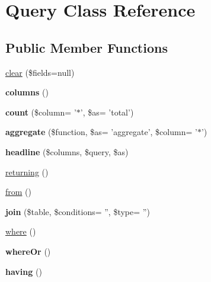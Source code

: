 \hypertarget{classQuery}{
\section{Query Class Reference}
\label{classQuery}
}
\subsection*{Public Member Functions}
\begin{DoxyCompactItemize}
\item 
\hyperlink{classQuery_af219d3aed5b3940b49d414d69bab501d}{clear} (\$fields=null)
\item 
\hypertarget{classQuery_ac5a3db6877b1d63b67def06e24bb86cb}{
{\bfseries columns} ()}
\label{classQuery_ac5a3db6877b1d63b67def06e24bb86cb}

\item 
\hypertarget{classQuery_a5e5d7b30a86a5b809137a57a62b684fa}{
{\bfseries count} (\$column= '$\ast$', \$as= 'total')}
\label{classQuery_a5e5d7b30a86a5b809137a57a62b684fa}

\item 
\hypertarget{classQuery_a9ec81787bd0d69ec85987a047915bcb9}{
{\bfseries aggregate} (\$function, \$as= 'aggregate', \$column= '$\ast$')}
\label{classQuery_a9ec81787bd0d69ec85987a047915bcb9}

\item 
\hypertarget{classQuery_ae158383677b601890431921bb035f51b}{
{\bfseries headline} (\$columns, \$query, \$as)}
\label{classQuery_ae158383677b601890431921bb035f51b}

\item 
\hyperlink{classQuery_af44f7bf797779dbbb930e60a53011c6b}{returning} ()
\item 
\hyperlink{classQuery_aaa091145c66718e59db922d065160863}{from} ()
\item 
\hypertarget{classQuery_ade76ff8694567ab372a4f450bb1bcd2e}{
{\bfseries join} (\$table, \$conditions= '', \$type= '')}
\label{classQuery_ade76ff8694567ab372a4f450bb1bcd2e}

\item 
\hyperlink{classQuery_ab1781adb9932c6280373e2abd698f9c8}{where} ()
\item 
\hypertarget{classQuery_a296b505b36d9bc21dfa1608471eabede}{
{\bfseries whereOr} ()}
\label{classQuery_a296b505b36d9bc21dfa1608471eabede}

\item 
\hypertarget{classQuery_a050021933ad19f7394afd8c47bd1e4ed}{
{\bfseries having} ()}
\label{classQuery_a050021933ad19f7394afd8c47bd1e4ed}


\end{DoxyCompactItemize}
